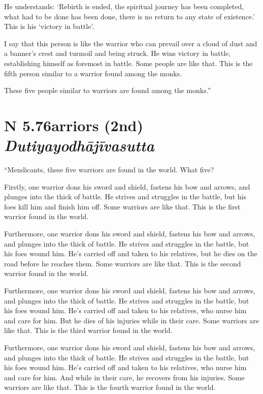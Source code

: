 \documentclass[12pt,openany]{book}%
\newcommand*{\suttatitleacronym}[1]{\smaller[2]{#1}\vspace*{.3em}}
\newcommand*{\suttatitletranslation}[1]{\linebreak{#1}}
\newcommand*{\suttatitleroot}[1]{\linebreak\smaller[2]\itshape{#1}}
\newcommand*{\tocacronym}[1]{\hspace*{-3.3em}{#1}\quad}
\newcommand*{\toctranslation}[1]{#1}
\newcommand*{\tocroot}[1]{(\textit{#1})}
\begin{document}
He understands: ‘Rebirth is ended, the spiritual journey has been completed, what had to be done has been done, there is no return to any state of existence.’ This is his ‘victory in battle’. 

I say that this person is like the warrior who can prevail over a cloud of dust and a banner’s crest and turmoil and being struck. He wins victory in battle, establishing himself as foremost in battle. Some people are like that. This is the fifth person similar to a warrior found among the monks. 

These five people similar to warriors are found among the monks.” 

%
\section*{{\suttatitleacronym AN 5.76}{\suttatitletranslation Warriors (2nd) }{\suttatitleroot Dutiyayodhājīvasutta}}
\addcontentsline{toc}{section}{\tocacronym{AN 5.76} \toctranslation{Warriors (2nd) } \tocroot{Dutiyayodhājīvasutta}}

“Mendicants, these five warriors are found in the world. What five? 

Firstly, one warrior dons his sword and shield, fastens his bow and arrows, and plunges into the thick of battle. He strives and struggles in the battle, but his foes kill him and finish him off. Some warriors are like that. This is the first warrior found in the world. 

Furthermore, one warrior dons his sword and shield, fastens his bow and arrows, and plunges into the thick of battle. He strives and struggles in the battle, but his foes wound him. He’s carried off and taken to his relatives, but he dies on the road before he reaches them. Some warriors are like that. This is the second warrior found in the world. 

Furthermore, one warrior dons his sword and shield, fastens his bow and arrows, and plunges into the thick of battle. He strives and struggles in the battle, but his foes wound him. He’s carried off and taken to his relatives, who nurse him and care for him. But he dies of his injuries while in their care. Some warriors are like that. This is the third warrior found in the world. 

Furthermore, one warrior dons his sword and shield, fastens his bow and arrows, and plunges into the thick of battle. He strives and struggles in the battle, but his foes wound him. He’s carried off and taken to his relatives, who nurse him and care for him. And while in their care, he recovers from his injuries. Some warriors are like that. This is the fourth warrior found in the world. 
\end{document}
